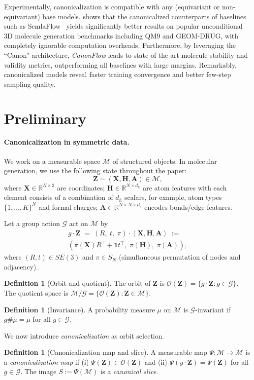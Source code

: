 \documentclass{article}
\theoremstyle{plain}
\theoremstyle{definition}
\newtheorem{definition}[theorem]{Definition}
\theoremstyle{remark}
\newcommand{\R}{\mathbb{R}}
\newcommand{\1}{\mathbf{1}}
\newcommand{\G}{\mathcal{G}}
\newcommand{\M}{\mathcal{M}}
\newcommand{\Z}{\mathbf{Z}}
\newcommand{\Hc}{\mathbf{H}}
\newcommand{\A}{\mathbf{A}}
\newcommand{\Xc}{\mathbf{X}}
\newcommand{\push}{\#} %
\newcommand{\acts}{\cdot} %
\newcommand{\Orb}{\mathcal{O}}
\begin{document}
Experimentally, canonicalization is compatible with any (equivariant or non-equivariant) base models.  shows that the canonicalized counterparts of baselines such as SemlaFlow~\citep{irwin2024semlaflow} yields significantly better results on popular unconditional 3D molecule generation benchmarks including QM9 and GEOM-DRUG, with completely ignorable computation overheads. Furthermore, by leveraging the ``Canon" architecture, \emph{CanonFlow} leads to state-of-the-art molecule stability and validity metrics, outperforming all baselines with large margins. Remarkably, canonicalized models reveal faster training convergence and better few-step sampling quality.

\section{Preliminary}\label{sec:preliminary}

\paragraph{Canonicalization in symmetric data.}

We work on a measurable space $\M$ of structured objects. In molecular generation, we use the following state throughout the paper:
\[
\Z = (\Xc,\Hc, \A)\in \M,
\]
where $\Xc\in \R^{N\times 3}$ are coordinates; $\Hc\in \R^{N\times d_h}$ are atom features with each element consists of a combination of $d_h$ scalars, for example, atom types $\{1,\dots,K\}^N$ and formal charges; $\A\in\R^{N\times N\times d_e}$ encodes bonds/edge features.

Let a group action $\G$ act on $\M$ by
\begin{equation}
\begin{aligned}
g\acts \Z \;=\; (R,\;t,\;\pi)\acts (\Xc,\Hc,\A)\;:=\;\\(\pi(\Xc)R^\top + \1 t^\top,\;\pi(\Hc),\;\pi(\A)),
\end{aligned}
\end{equation}
where $(R,t)\in SE(3)$ and $\pi\in S_N$ (simultaneous permutation of nodes and adjacency).

\begin{definition}[Orbit and quotient]
The orbit of $\Z$ is $\Orb(\Z)=\{g\acts \Z: g\in\G\}$. The quotient space is $\M/\G=\{\Orb(\Z):\Z\in\M\}$.
\end{definition}

\begin{definition}[Invariance]
A probability measure $\mu$ on $\M$ is $\G$-invariant if $g\push\mu=\mu$ for all $g\in\G$.
\end{definition}
We now introduce \emph{canonicalization} as orbit selection.
\begin{definition}[Canonicalization map and slice]\label{def:map_slice}
A measurable map $\Psi:\M\to \M$ is a \emph{canonicalization map} if (i) $\Psi(\Z)\in\Orb(\Z)$ and (ii) $\Psi(g\acts \Z)=\Psi(\Z)$ for all $g\in\G$. The image $S:=\Psi(\M)$ is a \emph{canonical slice}.
\end{definition}
\end{document}
